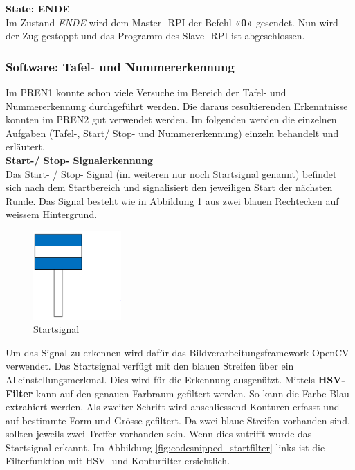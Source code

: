 \documentclass[../../main.tex]{subfiles}
\begin{document}
\textbf{State: ENDE}\\
Im Zustand \textit{ENDE} wird dem Master- RPI der Befehl \textbf{«0»} gesendet. Nun wird der Zug gestoppt und das Programm des Slave- RPI ist abgeschlossen.

\newpage

\subsubsection{Software: Tafel- und Nummererkennung}
Im PREN1 konnte schon viele Versuche im Bereich der Tafel- und Nummererkennung durchgeführt werden. Die daraus resultierenden Erkenntnisse konnten im PREN2 gut verwendet werden. Im folgenden werden die einzelnen Aufgaben (Tafel-, Start/ Stop- und Nummererkennung) einzeln behandelt und erläutert. \\

\textbf{Start-/ Stop- Signalerkennung}\\
Das Start- / Stop- Signal (im weiteren nur noch Startsignal genannt) befindet sich nach dem Startbereich und signalisiert den jeweiligen Start der nächsten Runde. Das Signal besteht wie in Abbildung \ref{fig:startsignal} aus zwei blauen Rechtecken auf weissem Hintergrund. 

\begin{figure} %
  \begin{center}
    \includegraphics[width=0.3\textwidth]{startsignal.png}
  \end{center}
  \caption{Startsignal}
  \label{fig:startsignal}
\end{figure}

Um das Signal zu erkennen wird dafür das Bildverarbeitungsframework OpenCV verwendet. Das Startsignal verfügt mit den blauen Streifen über ein Alleinstellungsmerkmal. Dies wird für die Erkennung ausgenützt. Mittels \textbf{HSV- Filter} kann auf den genauen Farbraum gefiltert werden. So kann die Farbe Blau extrahiert werden. Als zweiter Schritt wird anschliessend Konturen erfasst und auf bestimmte Form und Grösse gefiltert. Da zwei blaue Streifen vorhanden sind, sollten jeweils zwei Treffer vorhanden sein. Wenn dies zutrifft wurde das Startsignal erkannt. Im Abbildung \ref{fig:codesnipped_startfilter} links ist die Filterfunktion mit HSV- und Konturfilter ersichtlich.
\end{document}
